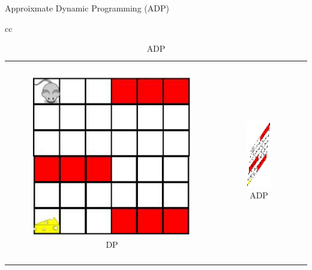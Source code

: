 \documentclass[10pt]{beamer}
\begin{document}
\begin{frame}[fragile]{Approixmate Dynamic Programming (ADP)}
\begin{table}
\begin{tabular}{cc}
\begin{minipage}{0.5\textwidth}
\begin{table}
\begin{tabular}{ccc}
\begin{minipage}{0.3\textwidth}
\begin{figure}
\includegraphics[scale=0.2]{mouse-single.png}
\caption*{DP}
\end{figure}
\end{minipage}
&
\begin{minipage}{0.3\textwidth}
\begin{figure}
\includegraphics[scale=0.2]{compress-mouse.png}
\caption*{ADP}
\end{figure}
\end{minipage}
&
\begin{minipage}{0.25\textwidth}
{\color{orange}{$\norm{J^*-J_{\tu}}$}}\\
\end{minipage}
\end{tabular}
\end{table}

\end{minipage}
\end{tabular}
\end{table}
\end{frame}
\end{document}
